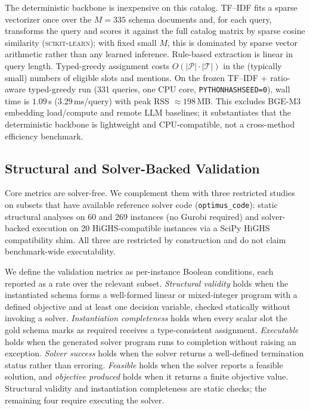 \documentclass[pdflatex,sn-basic,Numbered]{sn-jnl}
\begin{document}
The deterministic backbone is inexpensive on this catalog. TF--IDF fits a sparse vectorizer once over the $M=335$ schema documents and, for each query, transforms the query and scores it against the full catalog matrix by sparse cosine similarity (\textsc{scikit-learn}); with fixed small $M$, this is dominated by sparse vector arithmetic rather than any learned inference. Rule-based extraction is linear in query length. Typed-greedy assignment costs $O(|\mathcal{P}|\cdot|\mathcal{T}|)$ in the (typically small) numbers of eligible slots and mentions. On the frozen TF--IDF + ratio-aware typed-greedy run (331 queries, one CPU core, \texttt{PYTHONHASHSEED=0}), wall time is $1.09$\,s ($3.29$\,ms/query) with peak RSS $\approx 198$\,MB. This excludes BGE-M3 embedding load/compute and remote LLM baselines; it substantiates that the deterministic backbone is lightweight and CPU-compatible, not a cross-method efficiency benchmark.

\subsection{Structural and Solver-Backed Validation}
\label{subsec:exp_engineering}

Core metrics are solver-free. We complement them with three restricted studies on subsets that have available reference solver code (\texttt{optimus\_code}): static structural analyses on 60 and 269 instances (no Gurobi required) and solver-backed execution on 20 HiGHS-compatible instances via a SciPy HiGHS compatibility shim. All three are restricted by construction and do not claim benchmark-wide executability.

We define the validation metrics as per-instance Boolean conditions, each reported as a rate over the relevant subset. \emph{Structural validity} holds when the instantiated schema forms a well-formed linear or mixed-integer program with a defined objective and at least one decision variable, checked statically without invoking a solver. \emph{Instantiation completeness} holds when every scalar slot the gold schema marks as required receives a type-consistent assignment. \emph{Executable} holds when the generated solver program runs to completion without raising an exception. \emph{Solver success} holds when the solver returns a well-defined termination status rather than erroring. \emph{Feasible} holds when the solver reports a feasible solution, and \emph{objective produced} holds when it returns a finite objective value. Structural validity and instantiation completeness are static checks; the remaining four require executing the solver.
\end{document}
